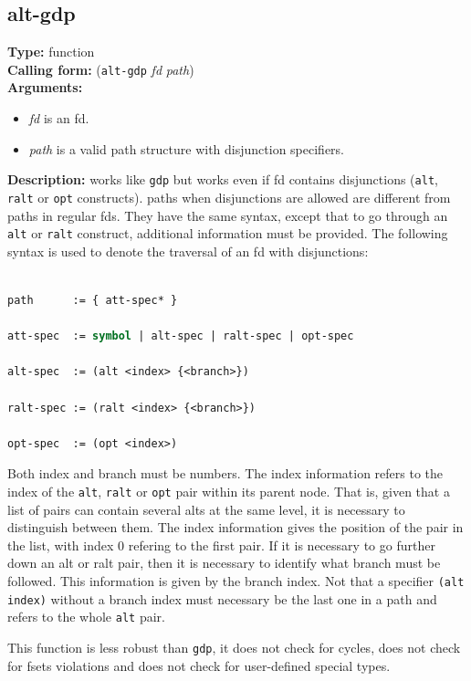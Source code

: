 \documentclass[10pt,a4paper]{report}
\begin{document}
\subsection{alt-gdp}
{\bf Type:} function
\\{\bf Calling form:} ({\tt alt-gdp} {\em fd} {\em path})
\\{\bf Arguments:}
\begin{itemize}
\item {\em fd} is an fd. 

\item {\em path} is a valid path structure with disjunction specifiers.
\end{itemize}
{\bf Description:} works like {\tt gdp} but works even if fd contains
disjunctions ({\tt alt}, {\tt ralt} or {\tt opt} constructs).  
paths when disjunctions are allowed are different from paths in regular
fds.  They have the same syntax, except that to go through an {\tt alt} or
{\tt ralt} construct, additional information must be provided.  The following
syntax is used to denote the traversal of an fd with disjunctions:
\begin{lstlisting}[language=Lisp]

path      := { att-spec* }

att-spec  := symbol | alt-spec | ralt-spec | opt-spec

alt-spec  := (alt <index> {<branch>})

ralt-spec := (ralt <index> {<branch>})

opt-spec  := (opt <index>)

\end{lstlisting}
Both index and branch must be numbers.
The index information refers to the index of the {\tt alt}, {\tt ralt} or
{\tt opt} pair within its parent node.  That is, given that a list of pairs
can contain several alts at the same level, it is necessary to distinguish
between them.  The index information gives the position of the pair in
the list, with index 0 refering to the first pair.  If it is necessary to
go further down an alt or ralt pair, then it is necessary to identify what
branch must be followed.  This information is given by the branch index.
Not that a specifier {\tt (alt index)} without a branch index must
necessary be the last one in a path and refers to the whole {\tt alt} pair.

This function is less robust than {\tt gdp}, it does not check for cycles,
does not check for fsets violations and does not check for user-defined
special types.  
\end{document}
